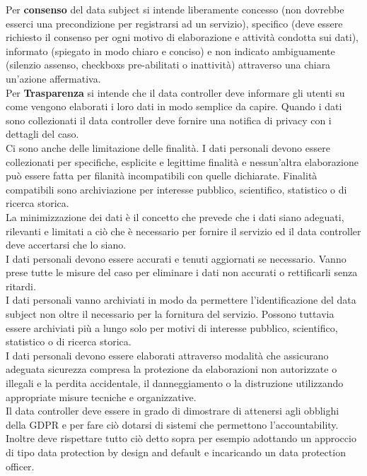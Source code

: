 Per \textbf{consenso} del data subject si intende liberamente concesso (non dovrebbe esserci una precondizione per registrarsi ad un servizio), specifico (deve essere richiesto il consenso per ogni motivo di elaborazione e attività condotta sui dati), informato (spiegato in modo chiaro e conciso) e non indicato ambiguamente (silenzio assenso, checkboxs pre-abilitati o inattività) attraverso una chiara un'azione affermativa.\\
Per \textbf{Trasparenza} si intende che il data controller deve informare gli utenti su come vengono elaborati i loro dati in modo semplice da capire.
Quando i dati sono collezionati il data controller deve fornire una notifica di privacy con i dettagli del caso.\\
Ci sono anche delle limitazione delle finalità.
I dati personali devono essere collezionati per specifiche, esplicite e legittime finalità e nessun'altra elaborazione può essere fatta per filanità incompatibili con quelle dichiarate.
Finalità compatibili sono archiviazione per interesse pubblico, scientifico, statistico o di ricerca storica.\\
La minimizzazione dei dati è il concetto che prevede che i dati siano adeguati, rilevanti e limitati a ciò che è necessario per fornire il servizio ed il data controller deve accertarsi che lo siano.\\
I dati personali devono essere accurati e tenuti aggiornati se necessario.
Vanno prese tutte le misure del caso per eliminare i dati non accurati o rettificarli senza ritardi.\\
I dati personali vanno archiviati in modo da permettere l'identificazione del data subject non oltre il necessario per la fornitura del servizio.
Possono tuttavia essere archiviati più a lungo solo per motivi di interesse pubblico, scientifico, statistico o di ricerca storica.\\
I dati personali devono essere elaborati attraverso modalità che assicurano adeguata sicurezza compresa la protezione da elaborazioni non autorizzate o illegali e la perdita accidentale, il danneggiamento o la distruzione utilizzando appropriate misure tecniche e organizzative.\\
Il data controller deve essere in grado di dimostrare di attenersi agli obblighi della \acrshort{GDPR} e per fare ciò dotarsi di sistemi che permettono l'accountability.
Inoltre deve rispettare tutto ciò detto sopra per esempio adottando un approccio di tipo data protection by design and default e incaricando un data protection officer.\\

